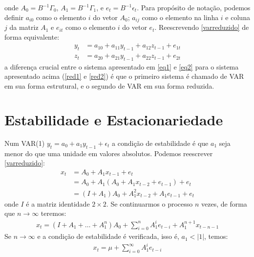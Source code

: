 \documentclass[11pt,a4paper]{article}
\begin{document}
\noindent
onde $A_0 = B^{-1}\Gamma_0$, $A_1 = B^{-1}\Gamma_1$, e $e_t = B^{-1}\epsilon_t$. Para propósito de notação, podemos definir $a_{i0}$ como o elemento $i$ do vetor $A_0$; $a_{ij}$ como o elemento na linha $i$ e coluna $j$ da matriz $A_1$ e $e_{it}$ como o elemento $i$ do vetor $e_{t}$. Reescrevendo \ref{varreduzido} de forma equivalente:
\begin{align} \label{red1}
y_t &= a_{10} + a_{11}y_{t-1} + a_{12}z_{t-1} + e_{1t} \\ \label{red2}
z_t &= a_{20} + a_{21}y_{t-1} + a_{22}z_{t-1} + e_{2t}
\end{align}
\noindent 
a diferença crucial entre o sistema apresentado em \ref{eq1} e \ref{eq2} para o sistema apresentado acima (\ref{red1} e \ref{red2}) é que o primeiro sistema é chamado de VAR em sua forma estrutural, e o segundo de VAR em sua forma reduzida.


\section{Estabilidade e Estacionariedade}

Num VAR(1) $y_t = a_0 + a_1 y_{t-1} + \epsilon_t$ a condição de estabilidade é que $a_1$ seja menor do que uma unidade em valores absolutos. Podemos reescrever \ref{varreduzido}:
\begin{align*}
x_t &= A_0 + A_1 x_{t-1} + e_t \\
    &= A_0 + A_1 (A_0 + A_1 x_{t-2} + e_{t-1}) + e_t \\
    &= (I + A_1)A_0 + A_1^{2}x_{t-2} + A_1 e_{t-1} + e_t
\end{align*}
\noindent
onde $I$ é a matriz identidade $2\times 2$. Se continuarmos o processo $n$ vezes, de forma que $n \rightarrow \infty$ teremos:
\begin{align*}
x_t = (I + A_1 + \dots + A_1^n)A_0 + \sum_{i=0}^{n} A_{1}^{i} e_{t-i} + A_1 ^{n+1} x_{t-n-1}
\end{align*}
Se $n \rightarrow \infty$ e a condição de estabilidade é verificada, isso é, $a_1 < |1|$, temos:
\begin{align}
x_t = \mu + \sum_{i=0}^{\infty}A_{1}^{i}e_{t-i}
\end{align}
\end{document}
